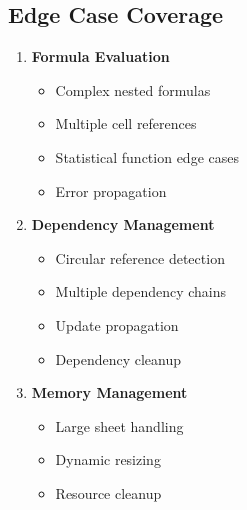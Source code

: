 \documentclass{article}
\begin{document}
\subsection{Edge Case Coverage}
\begin{enumerate}
    \item \textbf{Formula Evaluation}
    \begin{itemize}
        \item Complex nested formulas
        \item Multiple cell references
        \item Statistical function edge cases
        \item Error propagation
    \end{itemize}

    \item \textbf{Dependency Management}
    \begin{itemize}
        \item Circular reference detection
        \item Multiple dependency chains
        \item Update propagation
        \item Dependency cleanup
    \end{itemize}

    \item \textbf{Memory Management}
    \begin{itemize}
        \item Large sheet handling
        \item Dynamic resizing
        \item Resource cleanup
    \end{itemize}
\end{enumerate}
\end{document}
